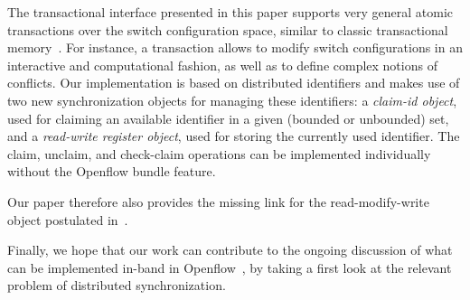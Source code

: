 \documentclass[conference]{sigcomm-alternate}
\begin{document}
The transactional interface presented in this paper supports very general atomic
transactions over the switch configuration space, similar to classic transactional memory~\cite{stm-st95,tm-book}.
For instance, a transaction allows to modify switch configurations in an interactive
and computational fashion, as well as to define complex notions
of conflicts.
Our implementation is based on distributed identifiers and makes use of two
new synchronization objects for managing these identifiers:
a \emph{claim-id object}, used for claiming an available identifier in a given
(bounded or unbounded) set, and a \emph{read-write register object}, used for storing the
currently used identifier.
The claim, unclaim, and check-claim operations can be implemented individually without the Openflow
bundle feature. 

Our paper therefore also provides the missing link for the read-modify-write object
postulated in~\cite{cpc}.


Finally, we hope that our work can contribute to the ongoing discussion of what can be implemented
in-band in Openflow~\cite{compute,reclaim}, by taking a first look
at the relevant problem of distributed
synchronization.

\end{document}

